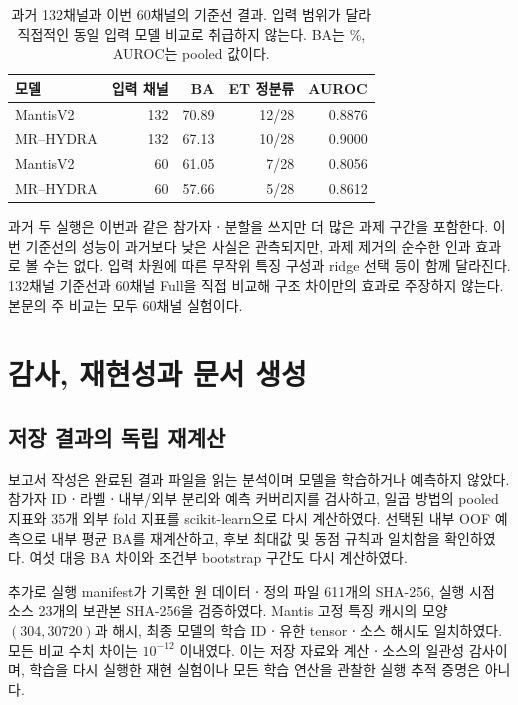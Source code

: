 \documentclass[11pt,a4paper]{article}
\numberwithin{equation}{section}
\begin{document}
\begin{table}[H]\centering\small
\caption{과거 132채널과 이번 60채널의 기준선 결과. 입력 범위가 달라 직접적인
동일 입력 모델 비교로 취급하지 않는다. BA는 \%, AUROC는 pooled 값이다.}
\begin{tabular}{@{}lrrrr@{}}\toprule
 모델 & 입력 채널 & BA & ET 정분류 & AUROC\\\midrule
MantisV2 & 132 & 70.89 & 12/28 & 0.8876 \\
MR--HYDRA & 132 & 67.13 & 10/28 & 0.9000 \\
MantisV2 & 60 & 61.05 & 7/28 & 0.8056 \\
MR--HYDRA & 60 & 57.66 & 5/28 & 0.8612 \\
\bottomrule\end{tabular}\label{tab:historical}
\end{table}
과거 두 실행은 이번과 같은 참가자ㆍ분할을 쓰지만 더 많은 과제 구간을 포함한다.
이번 기준선의 성능이 과거보다 낮은 사실은 관측되지만, 과제 제거의 순수한 인과
효과로 볼 수는 없다. 입력 차원에 따른 무작위 특징 구성과 ridge 선택 등이 함께
달라진다. 132채널 기준선과 60채널 Full을 직접 비교해 구조 차이만의 효과로
주장하지 않는다. 본문의 주 비교는 모두 60채널 실험이다.

\section{감사, 재현성과 문서 생성}
\subsection{저장 결과의 독립 재계산}
보고서 작성은 완료된 결과 파일을 읽는 분석이며 모델을 학습하거나 예측하지 않았다.
참가자 IDㆍ라벨ㆍ내부/외부 분리와 예측 커버리지를 검사하고,
일곱 방법의 pooled 지표와 35개 외부 fold 지표를 scikit-learn으로 다시 계산하였다.
선택된 내부 OOF 예측으로 내부 평균 BA를 재계산하고, 후보 최대값 및 동점 규칙과
일치함을 확인하였다. 여섯 대응 BA 차이와 조건부 bootstrap 구간도 다시 계산하였다.

추가로 실행 manifest가 기록한 원 데이터ㆍ정의 파일 611개의 SHA-256,
실행 시점 소스 23개의 보관본 SHA-256을 검증하였다.
Mantis 고정 특징 캐시의 모양 $(304,30720)$과 해시,
최종 모델의 학습 IDㆍ유한 tensorㆍ소스 해시도 일치하였다.
모든 비교 수치 차이는 $10^{-12}$ 이내였다.
이는 저장 자료와 계산ㆍ소스의 일관성 감사이며, 학습을 다시 실행한 재현 실험이나
모든 학습 연산을 관찰한 실행 추적 증명은 아니다.
\end{document}

